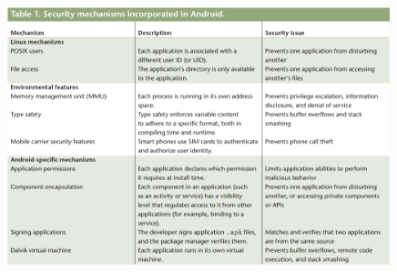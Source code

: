 \begin{figure}[h!]
    \centering
    \includegraphics[width=0.99\textwidth]{security_table}                                                                                                                                                                                                                                                                                                                                                                                                                                                                                                                                                                                                                                                                                                                                                                                                                                                                                                                                                                                                                                                                                                                                                                                                                                                                                                                                                                                                                                                                                                                                                                                                                                                                                                                                                                                                                                                                                                                                                                                                                                                                                                                                                                                                                                                                                                                                                                                                                                  
\end{figure}
